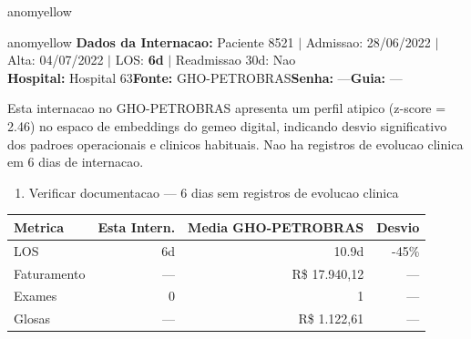 \documentclass[a4paper,10pt]{article}
\begin{document}
\begin{anomalycard}[Internacao 166300 | GHO-PETROBRAS | MODERADO (z=2.48)]{anomyellow}

\end{anomalycard}

\newpage

\begin{anomalycard}[Internacao 8616 | GHO-PETROBRAS | MODERADO (z=2.46)]{anomyellow}
\textbf{Dados da Internacao:} Paciente 8521 $\mid$ Admissao: 28/06/2022 $\mid$ Alta: 04/07/2022 $\mid$ LOS: \textbf{6d} $\mid$ Readmissao 30d: Nao\\
\textbf{Hospital:} Hospital 63\quad\textbf{Fonte:} GHO-PETROBRAS\quad\textbf{Senha:} ---\quad\textbf{Guia:} ---\\
\vspace{2pt}\begin{tcolorbox}[colback=severityred!20,colframe=anomyellow,title={\textbf{Interpretacao de Negocio}},fonttitle=\bfseries\small,left=4pt,right=4pt,top=3pt,bottom=3pt]
{\small Esta internacao no GHO-PETROBRAS apresenta um perfil atipico (z-score = 2.46) no espaco de embeddings do gemeo digital, indicando desvio significativo dos padroes operacionais e clinicos habituais. Nao ha registros de evolucao clinica em 6 dias de internacao.}
\end{tcolorbox}
\begin{tcolorbox}[colback=severityyellow!30,colframe=anomorange,title={\textbf{Recomendacoes Especificas}},fonttitle=\bfseries\small,left=4pt,right=4pt,top=3pt,bottom=3pt]
\begin{enumerate}[nosep,leftmargin=16pt]
\item {\small Verificar documentacao --- 6 dias sem registros de evolucao clinica}
\end{enumerate}
\end{tcolorbox}
\begin{center}\begin{tabular}{l r r r}\toprule\textbf{Metrica} & \textbf{Esta Intern.} & \textbf{Media GHO-PETROBRAS} & \textbf{Desvio} \\\midrule
LOS & 6d & 10.9d & -45\% \\
Faturamento & --- & R\$ 17.940,12 & --- \\
Exames & 0 & 1 & --- \\
Glosas & --- & R\$ 1.122,61 & --- \\
\bottomrule\end{tabular}\end{center}


\end{anomalycard}
\end{document}
